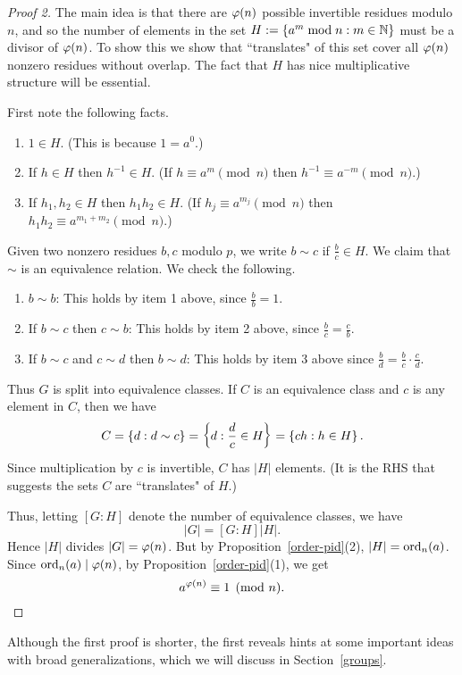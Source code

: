 \begin{proof}[Proof 2]
The main idea is that there are $\varphi(n)$ possible invertible residues modulo $n$, and so the number of elements in the set $H:=\left\{{a^m\bmod n}:{m\in \mathbb{N}}\right\}$ must be a divisor of $\varphi(n)$. To show this we show that ``translates" of this set cover all $\varphi(n)$ nonzero residues without overlap. The fact that $H$ has nice multiplicative structure will be essential.

First note the following facts.
\begin{enumerate}
\item $1\in H$. (This is because $1= a^0$.)
\item If $h\in H$ then $h^{-1}\in H$. (If $h\equiv a^m\pmod n$ then $h^{-1}\equiv a^{-m}\pmod n$.)
\item If $h_1,h_2\in H$ then $h_1h_2\in H$. (If $h_j\equiv a^{m_j}\pmod n$ then $h_1h_2\equiv a^{m_1+m_2}\pmod n$.)
\end{enumerate}
Given two nonzero residues $b,c$ modulo $p$, we write $b\sim c$ if $\frac{b}{c}\in H$. We claim that $\sim$ is an equivalence relation. We check the following.
\begin{enumerate}
\item $b\sim b$: This holds by item 1 above, since $\frac bb=1$.
\item If $b\sim c$ then $c\sim b$: This holds by item 2 above, since $\frac bc=\frac cb$.
\item If $b\sim c$ and $c\sim d$ then $b\sim d$: This holds by item 3 above since $\frac bd=\frac bc \cdot \frac cd$.
\end{enumerate}
Thus $G$ is split into equivalence classes. If $C$ is an equivalence class and $c$ is any element in $C$, then we have
\[
C=\left\{{d}:{d\sim c}\right\}=\left\{{d}:{\frac dc\in H}\right\}=\left\{{ch}:{h\in H}\right\}.
\]
Since multiplication by $c$ is invertible, $C$ has $|H|$ elements. (It is the RHS that suggests the sets $C$ are ``translates" of $H$.)

Thus, letting $[G:H]$ denote the number of equivalence classes, we have
\[
|G|=[G:H]|H|.
\]
Hence $|H|$ divides $|G|=\varphi(n)$. But by  Proposition~\ref{order-pid}(2), $|H|=\operatorname{ord}_n(a)$. Since $\operatorname{ord}_n(a)\mid \varphi(n)$, by Proposition~\ref{order-pid}(1), we get
\[
a^{\varphi(n)}\equiv 1\pmod n.\qedhere
\]
\end{proof}
Although the first proof is shorter, the first reveals hints at some important ideas with broad generalizations, which we will discuss in Section~\ref{groups}.
